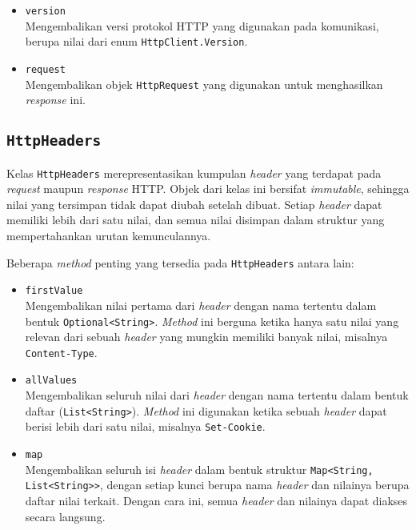 \begin{itemize}
    \item \texttt{version}\\
    Mengembalikan versi protokol HTTP yang digunakan pada komunikasi, berupa nilai dari enum \texttt{HttpClient.Version}.
    
    \item \texttt{request}\\
    Mengembalikan objek \texttt{HttpRequest} yang digunakan untuk menghasilkan \textit{response} ini.
\end{itemize}



\subsection{\texttt{HttpHeaders}}
\label{subsec:0228-httpheaders}

Kelas \texttt{HttpHeaders} merepresentasikan kumpulan \textit{header} yang terdapat pada \textit{request} maupun \textit{response} HTTP. Objek dari kelas ini bersifat \textit{immutable}, sehingga nilai yang tersimpan tidak dapat diubah setelah dibuat. Setiap \textit{header} dapat memiliki lebih dari satu nilai, dan semua nilai disimpan dalam struktur yang mempertahankan urutan kemunculannya.

Beberapa \textit{method} penting yang tersedia pada \texttt{HttpHeaders} antara lain:

\begin{itemize}
    \item \texttt{firstValue}\\
    Mengembalikan nilai pertama dari \textit{header} dengan nama tertentu dalam bentuk \texttt{Optional<String>}. \textit{Method} ini berguna ketika hanya satu nilai yang relevan dari sebuah \textit{header} yang mungkin memiliki banyak nilai, misalnya \texttt{Content-Type}.
    
    \item \texttt{allValues}\\
    Mengembalikan seluruh nilai dari \textit{header} dengan nama tertentu dalam bentuk daftar (\texttt{List<String>}). \textit{Method} ini digunakan ketika sebuah \textit{header} dapat berisi lebih dari satu nilai, misalnya \texttt{Set-Cookie}.
    
    \item \texttt{map}\\
    Mengembalikan seluruh isi \textit{header} dalam bentuk struktur \texttt{Map<String, List<String>>}, dengan setiap kunci berupa nama \textit{header} dan nilainya berupa daftar nilai terkait. Dengan cara ini, semua \textit{header} dan nilainya dapat diakses secara langsung.
\end{itemize}


